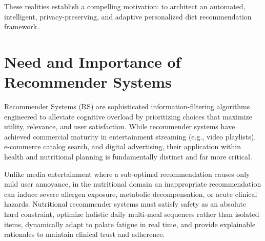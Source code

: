 \documentclass[12pt,a4paper]{report}
\begin{document}
These realities establish a compelling motivation: to architect an automated, intelligent, privacy-preserving, and adaptive personalized diet recommendation framework.

\section{Need and Importance of Recommender Systems}
Recommender Systems (RS) are sophisticated information-filtering algorithms engineered to alleviate cognitive overload by prioritizing choices that maximize utility, relevance, and user satisfaction. While recommender systems have achieved commercial maturity in entertainment streaming (e.g., video playlists), e-commerce catalog search, and digital advertising, their application within health and nutritional planning is fundamentally distinct and far more critical.

Unlike media entertainment where a sub-optimal recommendation causes only mild user annoyance, in the nutritional domain an inappropriate recommendation can induce severe allergen exposure, metabolic decompensation, or acute clinical hazards. Nutritional recommender systems must satisfy safety as an absolute hard constraint, optimize holistic daily multi-meal sequences rather than isolated items, dynamically adapt to palate fatigue in real time, and provide explainable rationales to maintain clinical trust and adherence.
\end{document}

